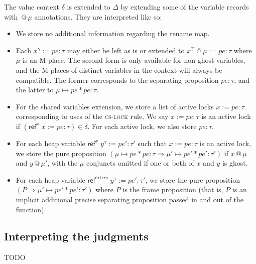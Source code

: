 \documentclass[acmsmall,nonacm]{acmart}
\begin{document}
The value context $\delta$ is extended to $\Delta$ by extending some of the variable records with $\mathrel{@}\mu$ annotations. They are interpreted like so:
\begin{itemize}
\item We store no additional information regarding the rename map.
\item Each $x^\gamma:=pe:\tau$ may either be left as is or extended to $x^{\top}\mathrel{@}\mu:=pe:\tau$ where $\mu$ is an M-place. The second form is only available for non-ghost variables, and the M-places of distinct variables in the context will always be compatible. The former corresponds to the separating proposition $\boxed{pe:\tau}$, and the latter to $\mu\mapsto pe\ast{}\boxed{pe:\tau}$.
\item For the shared variables extension, we store a list of active locks $x:=pe:\tau$ corresponding to uses of the \textsc{cs-lock} rule. We say $x:=pe:\tau$ is an active lock if $(\mathsf{ref}^x\;x:=pe:\tau)\in\delta$. For each active lock, we also store $\boxed{pe:\tau}$.
\item For each heap variable $\mathsf{ref}^x\;y^\gamma:=pe':\tau'$ such that $x:=pe:\tau$ is an active lock, we store the pure proposition $(\mu\mapsto pe\ast{}\boxed{pe:\tau}\Rightarrow \mu'\mapsto pe'\ast\boxed{pe':\tau'})$ if $x\mathrel{@}\mu$ and $y\mathrel{@}\mu'$, with the $\mu$ conjuncts omitted if one or both of $x$ and $y$ is ghost.
\item For each heap variable $\mathsf{ref}^\mathsf{extern}\;y^\gamma:=pe':\tau'$, we store the pure proposition $(P\Rightarrow \mu'\mapsto pe'\ast\boxed{pe':\tau'})$ where $P$ is the frame proposition (that is, $P$ is an implicit additional precise separating proposition passed in and out of the function).
\end{itemize}

\subsection{Interpreting the judgments}

TODO
\end{document}
